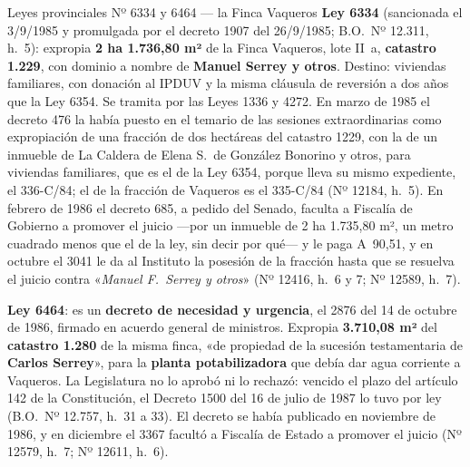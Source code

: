 \begin{ficha}{Leyes provinciales Nº 6334 y 6464 --- la Finca Vaqueros}
\textbf{Ley 6334} (sancionada el 3/9/1985 y promulgada por el decreto 1907 del 26/9/1985; B.O.\ Nº 12.311, h.\ 5): expropia \textbf{2 ha 1.736,80 m²} de la Finca Vaqueros, lote II~a, \textbf{catastro 1.229}, con dominio a nombre de \textbf{Manuel Serrey y otros}. Destino: viviendas familiares, con donación al IPDUV y la misma cláusula de reversión a dos años que la Ley 6354. Se tramita por las Leyes 1336 y 4272. En marzo de 1985 el decreto 476 la había puesto en el temario de las sesiones extraordinarias como expropiación de una fracción de dos hectáreas del catastro 1229, con la de un inmueble de La Caldera de Elena S.\ de González Bonorino y otros, para viviendas familiares, que es el de la Ley 6354, porque lleva su mismo expediente, el 336-C/84; el de la fracción de Vaqueros es el 335-C/84 (Nº 12184, h.\ 5). En febrero de 1986 el decreto 685, a pedido del Senado, faculta a Fiscalía de Gobierno a promover el juicio ---por un inmueble de 2 ha 1.735,80 m², un metro cuadrado menos que el de la ley, sin decir por qué--- y le paga A~90,51, y en octubre el 3041 le da al Instituto la posesión de la fracción hasta que se resuelva el juicio contra «\textit{Manuel F.\ Serrey y otros}» (Nº 12416, h.\ 6 y 7; Nº 12589, h.\ 7).

\textbf{Ley 6464}: es un \textbf{decreto de necesidad y urgencia}, el 2876 del 14 de octubre de 1986, firmado en acuerdo general de ministros. Expropia \textbf{3.710,08 m²} del \textbf{catastro 1.280} de la misma finca, «de propiedad de la sucesión testamentaria de \textbf{Carlos Serrey}», para la \textbf{planta potabilizadora} que debía dar agua corriente a Vaqueros. La Legislatura no lo aprobó ni lo rechazó: vencido el plazo del artículo 142 de la Constitución, el Decreto 1500 del 16 de julio de 1987 lo tuvo por ley (B.O.\ Nº 12.757, h.\ 31 a 33). El decreto se había publicado en noviembre de 1986, y en diciembre el 3367 facultó a Fiscalía de Estado a promover el juicio (Nº 12579, h.\ 7; Nº 12611, h.\ 6).
\end{ficha}

